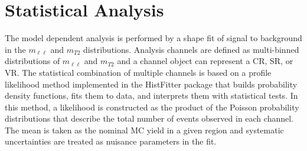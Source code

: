 \chapter{Statistical Analysis}
\label{ch:statanal}
The model dependent analysis is performed by a shape fit of signal to background in the $m_{\ell\ell}$ and $m_{T2}$ distributions.  Analysis channels are defined as multi-binned distributions of $m_{\ell\ell}$ and $m_{T2}$ and a channel object can represent a CR, SR, or VR. The statistical combination of multiple channels is based on a profile likelihood method implemented in the HistFitter package that builds probability density functions, fits them to data, and interprets them with statistical tests.  In this method, a likelihood is constructed as the product of the Poisson probability distributions that describe the total number of events observed in each channel.  The mean is taken as the nominal MC yield in a given region and systematic uncertainties are treated as nuisance parameters in the fit.  

